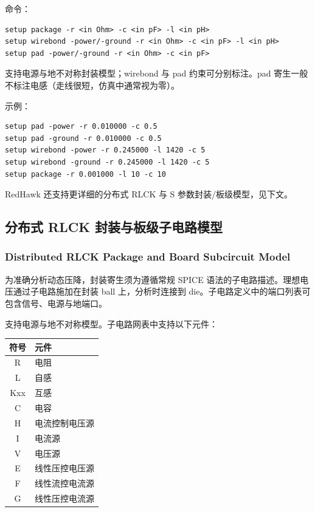命令：
\begin{lstlisting}
setup package -r <in Ohm> -c <in pF> -l <in pH>
setup wirebond -power/-ground -r <in Ohm> -c <in pF> -l <in pH>
setup pad -power/-ground -r <in Ohm> -c <in pF>
\end{lstlisting}

支持电源与地不对称封装模型；wirebond 与 pad 约束可分别标注。pad 寄生一般不标注电感（走线很短，仿真中通常视为零）。

示例：
\begin{lstlisting}
setup pad -power -r 0.010000 -c 0.5
setup pad -ground -r 0.010000 -c 0.5
setup wirebond -power -r 0.245000 -l 1420 -c 5
setup wirebond -ground -r 0.245000 -l 1420 -c 5
setup package -r 0.001000 -l 10 -c 10
\end{lstlisting}

RedHawk 还支持更详细的分布式 RLCK 与 S 参数封装/板级模型，见下文。

\subsection{分布式 RLCK 封装与板级子电路模型}
\subsubsection*{Distributed RLCK Package and Board Subcircuit Model}

为准确分析动态压降，封装寄生须为遵循常规 SPICE 语法的子电路描述。理想电压通过子电路施加在封装 ball 上，分析时连接到 die。子电路定义中的端口列表可包含信号、电源与地端口。

支持电源与地不对称模型。子电路网表中支持以下元件：

\begin{table}[htbp]
\centering
\small
\begin{tabular}{cl}
\toprule
\textbf{符号} & \textbf{元件} \\
\midrule
R & 电阻 \\
L & 自感 \\
Kxx & 互感 \\
C & 电容 \\
H & 电流控制电压源 \\
I & 电流源 \\
V & 电压源 \\
E & 线性压控电压源 \\
F & 线性流控电流源 \\
G & 线性压控电流源 \\
\bottomrule
\end{tabular}
\end{table}

